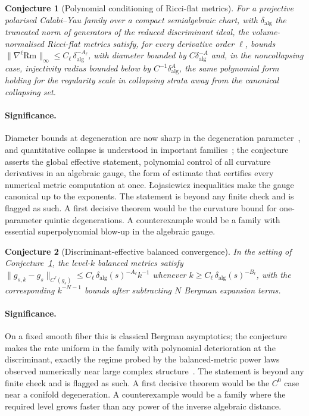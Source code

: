 \documentclass[11pt]{article}
\newtheorem{conjecture}{Conjecture}
\theoremstyle{definition}
\begin{document}
\begin{conjecture}[Polynomial conditioning of Ricci-flat metrics]\label{ad13}
For a projective polarised Calabi--Yau family over a compact semialgebraic chart, with $\delta_{\mathrm{alg}}$ the truncated norm of generators of the reduced discriminant ideal, the volume-normalised Ricci-flat metrics satisfy, for every derivative order $\ell$, bounds $\|\nabla^\ell\mathrm{Rm}\|_\infty\le C_\ell\,\delta_{\mathrm{alg}}^{-A_\ell}$, with diameter bounded by $C\delta_{\mathrm{alg}}^{-A}$ and, in the noncollapsing case, injectivity radius bounded below by $C^{-1}\delta_{\mathrm{alg}}^{A}$, the same polynomial form holding for the regularity scale in collapsing strata away from the canonical collapsing set.
\end{conjecture}

\paragraph{Significance.}
Diameter bounds at degeneration are now sharp in the degeneration parameter~\cite{Li20}, and quantitative collapse is understood in important families~\cite{SZ19}; the conjecture asserts the global effective statement, polynomial control of all curvature derivatives in an algebraic gauge, the form of estimate that certifies every numerical metric computation at once.  \L ojasiewicz inequalities make the gauge canonical up to the exponents.  The statement is beyond any finite check and is flagged as such.  A first decisive theorem would be the curvature bound for one-parameter quintic degenerations.  A counterexample would be a family with essential superpolynomial blow-up in the algebraic gauge.

\begin{conjecture}[Discriminant-effective balanced convergence]\label{ad14}
In the setting of Conjecture~\ref{ad13}, the level-$k$ balanced metrics satisfy $\|g_{s,k}-g_s\|_{C^\ell(g_s)}\le C_\ell\,\delta_{\mathrm{alg}}(s)^{-A_\ell}k^{-1}$ whenever $k\ge C_\ell\,\delta_{\mathrm{alg}}(s)^{-B_\ell}$, with the corresponding $k^{-N-1}$ bounds after subtracting $N$ Bergman expansion terms.
\end{conjecture}

\paragraph{Significance.}
On a fixed smooth fiber this is classical Bergman asymptotics; the conjecture makes the rate uniform in the family with polynomial deterioration at the discriminant, exactly the regime probed by the balanced-metric power laws observed numerically near large complex structure~\cite{BHJMM26}.  The statement is beyond any finite check and is flagged as such.  A first decisive theorem would be the $C^0$ case near a conifold degeneration.  A counterexample would be a family where the required level grows faster than any power of the inverse algebraic distance.
\end{document}
